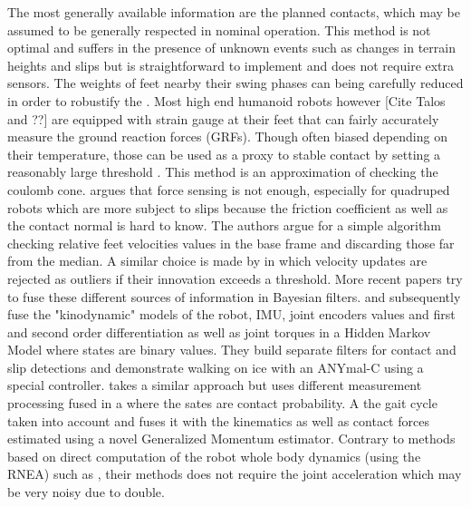 The most generally available information are the planned contacts, which may be assumed to be generally respected in nominal operation. 
This method is not optimal and suffers in the presence of unknown events such as changes in terrain heights and slips but is straightforward to implement and 
does not require extra sensors. The weights of feet nearby their swing phases can being carefully reduced in order to robustify the \cite{leziart2021implementation, bledt2018contact}. 
Most high end humanoid robots however [Cite Talos and ??] are equipped with strain gauge at their feet that can fairly accurately measure the ground reaction forces (GRFs). 
Though often biased depending on their temperature, those can be used as a proxy to stable contact by setting a reasonably large threshold \cite{fallon2014drift}. 
This method is an approximation of checking the coulomb cone.
\cite{Focchi2015SlipDA} argues that force sensing is not enough, especially for quadruped robots which are more subject to slips because the friction coefficient
as well as the contact normal is hard to know. The authors argue for a simple algorithm checking relative feet velocities values in the base frame and discarding those
far from the median. A similar choice is made by \cite{bloesch2013stateSlippery} in which \KalmanF velocity updates are rejected as outliers if their innovation exceeds a threshold.  
More recent papers try to fuse these different sources of information in Bayesian filters. \cite{hwangbo2016probabilistic} and subsequently \cite{jenelten2019dynamic} fuse 
the "kinodynamic" models of the robot, IMU, joint encoders values and first and second order differentiation as well as
joint torques in a Hidden Markov Model where states are binary values. They build separate filters for contact and slip detections and demonstrate walking on ice with an ANYmal-C using a special controller.
\cite{bledt2018contact} takes a similar approach but uses different measurement processing fused in a \KalmanF where the sates are contact probability. 
A the gait cycle taken into account and fuses it with the kinematics as well as contact forces estimated using a novel Generalized Momentum estimator. Contrary to methods 
based on direct computation of the robot whole body dynamics (using the RNEA) such as \cite{hwangbo2016probabilistic}, their methods does not require the joint acceleration which may be very noisy due to double.  

